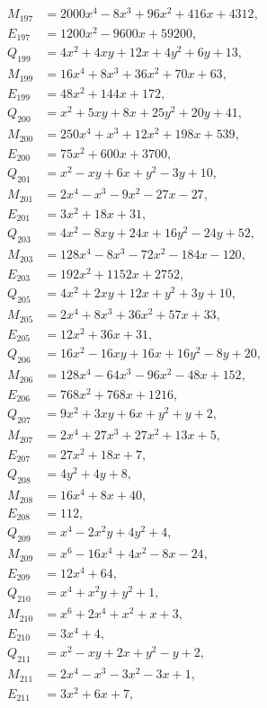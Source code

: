 \documentclass[11pt]{article}
\begin{document}
\begin{align*}
M_{197}&=2000x^{4}-8x^{3}+96x^{2}+416x+4312,\\
E_{197}&=1200x^{2}-9600x+59200,\\
Q_{199}&=4x^{2}+4xy+12x+4y^{2}+6y+13,\\
M_{199}&=16x^{4}+8x^{3}+36x^{2}+70x+63,\\
E_{199}&=48x^{2}+144x+172,\\
Q_{200}&=x^{2}+5xy+8x+25y^{2}+20y+41,\\
M_{200}&=250x^{4}+x^{3}+12x^{2}+198x+539,\\
E_{200}&=75x^{2}+600x+3700,\\
Q_{201}&=x^{2}-xy+6x+y^{2}-3y+10,\\
M_{201}&=2x^{4}-x^{3}-9x^{2}-27x-27,\\
E_{201}&=3x^{2}+18x+31,\\
Q_{203}&=4x^{2}-8xy+24x+16y^{2}-24y+52,\\
M_{203}&=128x^{4}-8x^{3}-72x^{2}-184x-120,\\
E_{203}&=192x^{2}+1152x+2752,\\
Q_{205}&=4x^{2}+2xy+12x+y^{2}+3y+10,\\
M_{205}&=2x^{4}+8x^{3}+36x^{2}+57x+33,\\
E_{205}&=12x^{2}+36x+31,\\
Q_{206}&=16x^{2}-16xy+16x+16y^{2}-8y+20,\\
M_{206}&=128x^{4}-64x^{3}-96x^{2}-48x+152,\\
E_{206}&=768x^{2}+768x+1216,\\
Q_{207}&=9x^{2}+3xy+6x+y^{2}+y+2,\\
M_{207}&=2x^{4}+27x^{3}+27x^{2}+13x+5,\\
E_{207}&=27x^{2}+18x+7,\\
Q_{208}&=4y^{2}+4y+8,\\
M_{208}&=16x^{4}+8x+40,\\
E_{208}&=112,\\
Q_{209}&=x^{4}-2x^{2}y+4y^{2}+4,\\
M_{209}&=x^{6}-16x^{4}+4x^{2}-8x-24,\\
E_{209}&=12x^{4}+64,\\
Q_{210}&=x^{4}+x^{2}y+y^{2}+1,\\
M_{210}&=x^{6}+2x^{4}+x^{2}+x+3,\\
E_{210}&=3x^{4}+4,\\
Q_{211}&=x^{2}-xy+2x+y^{2}-y+2,\\
M_{211}&=2x^{4}-x^{3}-3x^{2}-3x+1,\\
E_{211}&=3x^{2}+6x+7,\\

\end{align*}
\end{document}
